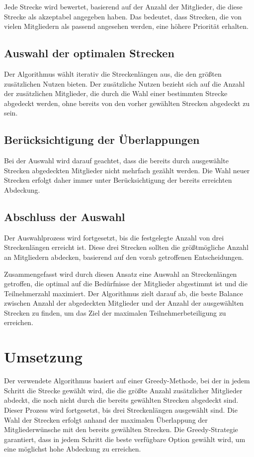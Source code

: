 \documentclass[a4paper,10pt,ngerman]{scrartcl}
\begin{document}
Jede Strecke wird bewertet, basierend auf der Anzahl der Mitglieder, die diese Strecke als akzeptabel angegeben haben. Das bedeutet, dass Strecken, die von vielen Mitgliedern als passend angesehen werden, eine höhere Priorität erhalten.

\subsection{Auswahl der optimalen Strecken}

Der Algorithmus wählt iterativ die Streckenlängen aus, die den größten zusätzlichen Nutzen bieten. Der zusätzliche Nutzen bezieht sich auf die Anzahl der zusätzlichen Mitglieder, die durch die Wahl einer bestimmten Strecke abgedeckt werden, ohne bereits von den vorher gewählten Strecken abgedeckt zu sein.

\subsection{Berücksichtigung der Überlappungen}

Bei der Auswahl wird darauf geachtet, dass die bereits durch ausgewählte Strecken abgedeckten Mitglieder nicht mehrfach gezählt werden. Die Wahl neuer Strecken erfolgt daher immer unter Berücksichtigung der bereits erreichten Abdeckung.

\subsection{Abschluss der Auswahl}

Der Auswahlprozess wird fortgesetzt, bis die festgelegte Anzahl von drei Streckenlängen erreicht ist. Diese drei Strecken sollten die größtmögliche Anzahl an Mitgliedern abdecken, basierend auf den vorab getroffenen Entscheidungen.

Zusammengefasst wird durch diesen Ansatz eine Auswahl an Streckenlängen getroffen, die optimal auf die Bedürfnisse der Mitglieder abgestimmt ist und die Teilnehmerzahl maximiert. Der Algorithmus zielt darauf ab, die beste Balance zwischen Anzahl der abgedeckten Mitglieder und der Anzahl der ausgewählten Strecken zu finden, um das Ziel der maximalen Teilnehmerbeteiligung zu erreichen.

\section{Umsetzung}

Der verwendete Algorithmus basiert auf einer Greedy-Methode, bei der in jedem Schritt die Strecke gewählt wird, die die größte Anzahl zusätzlicher Mitglieder abdeckt, die noch nicht durch die bereits gewählten Strecken abgedeckt sind. Dieser Prozess wird fortgesetzt, bis drei Streckenlängen ausgewählt sind. Die Wahl der Strecken erfolgt anhand der maximalen Überlappung der Mitgliederwünsche mit den bereits gewählten Strecken. Die Greedy-Strategie garantiert, dass in jedem Schritt die beste verfügbare Option gewählt wird, um eine möglichst hohe Abdeckung zu erreichen.
\end{document}
